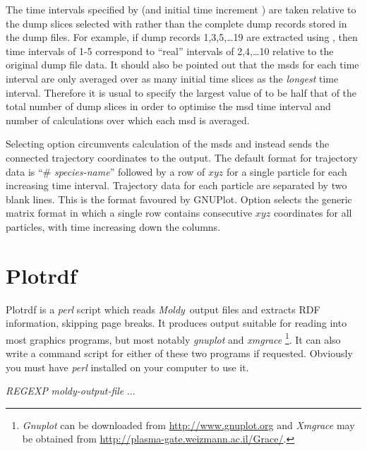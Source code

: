\documentclass[a4paper,twoside]{report}
\newcommand{\moldy}{\emph{Moldy}}
\begin{document}
The time intervals specified by  (and initial time increment
) are taken relative to the dump slices selected with 
rather than the complete dump records stored in the dump files. For
example, if dump records 1,3,5,\ldots{}19 are extracted using , then
time intervals of  1-5 correspond to ``real'' intervals of
2,4,\ldots{}10 relative to the original dump file data. It should also be
pointed out that the msds for each time interval are only averaged
over as many initial time slices as the \emph{longest} time interval.
Therefore it is usual to specify the largest value of  to be
half that of the total number of dump slices in order to optimise the
msd time interval and number of calculations over which each msd is
averaged.

Selecting option  circumvents calculation of the msds and
instead sends the connected trajectory coordinates to the output. The
default format for trajectory data is ``\# \textit{species-name}'' followed by a
row of $x y z$ for a single particle for each increasing time interval.
Trajectory data for each particle are separated by two blank lines.
This is the format favoured by GNUPlot. Option   selects
the generic matrix format in which a single row contains consecutive $x
y z$ coordinates for all particles, with time increasing down the
columns.

\section{Plotrdf}%
Plotrdf is a \emph{perl} script which reads \moldy\ output files and
extracts RDF information, skipping page breaks.  It produces output
suitable for reading into most graphics programs, but most notably
\emph{gnuplot} and \emph{xmgrace}%
\footnote{\emph{Gnuplot} can be downloaded from
  \url{http://www.gnuplot.org} and
\emph{Xmgrace} may be obtained from
\url{http://plasma-gate.weizmann.ac.il/Grace/}.}.
It can also write a command script
for either of these two programs if requested.  Obviously you must
have \emph{perl} installed on your computer to use it.

\begin{center}
 \Lit{[-a]} 
 \Lit{[-gp|-xg]}
 \Lit{[-ps|-eps]}
 \Lit{[-np]}
 \Lit{[-m} \textit{REGEXP}\Lit{]} 
 \textit{moldy-output-file} ...
\end{center}
\end{document}
